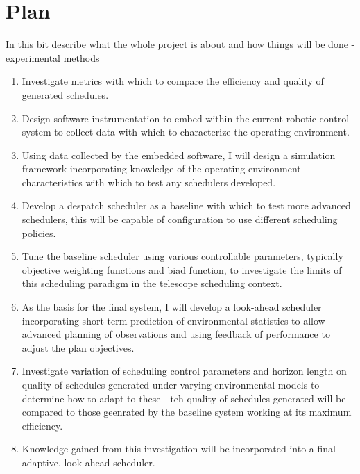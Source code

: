 



\section{Plan}
In this bit describe what the whole project is about and how things will be done
-experimental methods 
\begin{enumerate}
\item Investigate metrics with which to compare the efficiency and quality of generated schedules.
\item Design software instrumentation to embed within the current robotic control system to collect data with which to characterize the operating environment.
\item Using data collected by the embedded software, I will design a simulation framework incorporating knowledge of the operating environment characteristics with which to test any schedulers developed.
\item Develop a despatch scheduler as a baseline with which to test more advanced schedulers, this will be capable of configuration to use different scheduling policies.
\item Tune the baseline scheduler using various controllable parameters, typically objective weighting functions and biad function, to investigate the limits of this scheduling paradigm in the telescope scheduling context.
\item As the basis for the final system, I will develop a look-ahead scheduler incorporating short-term prediction of environmental statistics to allow advanced planning of observations and using feedback of performance to adjust the plan objectives.
\item Investigate variation of scheduling control parameters and horizon length on quality of schedules generated under varying environmental models to determine how to adapt to these - teh quality of schedules generated will be compared to those geenrated by the baseline system working at its maximum efficiency.
\item Knowledge gained from this investigation will be incorporated into a final adaptive, look-ahead scheduler.
\end{enumerate}

